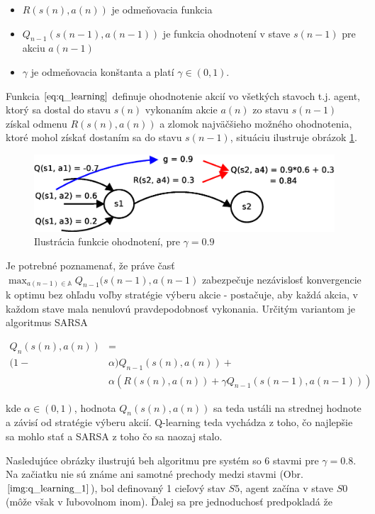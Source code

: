 \begin{itemize}
 \item $R(s(n),a(n))$ je odmeňovacia funkcia
 \item $Q_{n-1}(s(n-1),a(n-1))$ je funkcia ohodnotení v stave $s(n-1)$ pre akciu $a(n-1)$
 \item $\gamma$ je odmeňovacia konštanta a platí $\gamma \in (0, 1)$.
\end{itemize}

Funkcia $\ref{eq:q_learning}$ definuje ohodnotenie akcií vo všetkých stavoch t.j.
agent, ktorý sa dostal do stavu $s(n)$ vykonaním akcie $a(n)$ zo stavu
$s(n-1)$ získal odmenu $R(s(n),a(n))$ a zlomok najväčšieho možného ohodnotenia, ktoré
mohol získať dostaním sa do stavu $s(n-1)$, situáciu ilustruje obrázok \ref{img:q_learning}.


\begin{figure}[!htb]
\center
\includegraphics[scale=.6]{../diagrams/q_learning_detail.eps}
\caption{Ilustrácia funkcie ohodnotení, pre $\gamma = 0.9$}
\label{img:q_learning}
\end{figure}

Je potrebné poznamenať, že práve časť $\max_{a(n-1) \in \mathbb{A}} Q_{n-1}(s(n-1), a(n-1)$
zabezpečuje nezávislosť konvergencie k optimu bez ohľadu voľby stratégie výberu akcie -
postačuje, aby každá akcia, v každom stave mala nenulovú pravdepodobnosť vykonania.
Určitým variantom je algoritmus SARSA \cite{bib:sarsa}

\begin{align}
Q_{n}(s(n),a(n)) &= \nonumber \\
 (1-&\alpha)Q_{n-1}(s(n),a(n)) + \nonumber  \\
&\alpha(R(s(n),a(n)) + \gamma Q_{n-1}(s(n-1), a(n-1)))
\label{eq:sarsa}
\end{align}

kde $\alpha \in (0, 1)$, hodnota $Q_{n}(s(n),a(n))$ sa  teda ustáli na strednej hodnote
a závisí od stratégie výberu akcií. Q-learning teda vychádza z toho, čo najlepšie sa mohlo stať
a SARSA z toho čo sa naozaj stalo.


Nasledujúce obrázky ilustrujú beh algoritmu pre systém so 6 stavmi pre $\gamma = 0.8$.
Na začiatku nie sú známe ani samotné prechody medzi stavmi (Obr. $\ref{img:q_learning_1}$), bol definovaný
1 cieľový stav $S5$, agent začína v stave $S0$ (môže však v ľubovolnom inom).
Ďalej sa pre jednoduchosť predpokladá že

